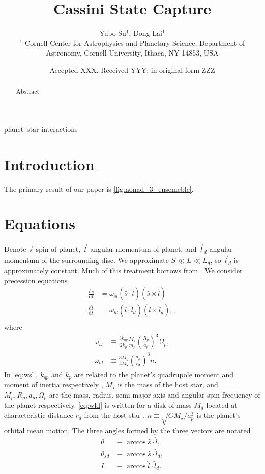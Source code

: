\documentclass[
        fleqn,
        usenatbib,
    ]{mnras}
\title[Cassini State Capture]{Cassini State Capture}
\author[Y. Su et\ al.]{
Yubo Su$^1$,
Dong Lai$^1$
\\
$^1$ Cornell Center for Astrophysics and Planetary Science, Department of
Astronomy, Cornell University, Ithaca, NY 14853, USA
}
\date{Accepted XXX\@. Received YYY\@; in original form ZZZ}
\newcommand*{\rd}[2]{\frac{\mathrm{d}#1}{\mathrm{d}#2}}
\newcommand*{\p}[1]{\left(#1\right)}
\begin{document}
\label{firstpage}
\pagerange{\pageref{firstpage}--\pageref{lastpage}}
\renewcommand*{\sectionautorefname}{Section}
\maketitle


\begin{abstract}
    Abstract
\end{abstract}

\begin{keywords}
planet--star interactions %
\end{keywords}

\section{Introduction}

The primary result of our paper is \autoref{fig:nonad_3_ensemeble}.

\section{Equations}\label{s:eq}

Denote $\vec{s}$ spin of planet, $\vec{l}$ angular momentum of planet, and
$\vec{l}_d$ angular momentum of the surrounding disc. We approximate $S \ll L
\ll L_d$, so $\vec{l}_d$ is approximately constant. Much of this treatment
borrows from \citep{anderson2018teeter}. We consider precession equations
\begin{align}
    \rd{\hat{s}}{t} &= \omega_{sl} \p{\hat{s} \cdot \hat{l}}
        \p{\hat{s} \times \hat{l}}\label{eq:dsdt}\\
    \rd{\hat{l}}{t} &= \omega_{ld}\p{\hat{l} \cdot \hat{l}_d}
        \p{\hat{l} \times \hat{l}_d},\label{eq:dldt},\\
\end{align}
where
\begin{align}
    \omega_{sl} &\equiv \frac{3k_{qp}}{2k_p} \frac{M_\star}{m_p}
        \p{\frac{R_p}{a_p}}^3 \Omega_p,\label{eq:wsl}\\
    \omega_{ld} &\equiv \frac{3M_d}{4M_\star}\p{\frac{a_p}{r_d}}^3 n
        .\label{eq:wld}
\end{align}
In \autoref{eq:wsl}, $k_{qp}$ and $k_p$ are related to the planet's quadrupole
moment and moment of inertia respectively \citep[see][]{lai2018}, $M_\star$ is
the mass of the host star, and $M_p, R_p, a_p, \Omega_p$ are the mass, radius,
semi-major axis and angular spin frequency of the planet respectively.
\autoref{eq:wld} is written for a disk of mass $M_d$ located at characteristic
distance $r_d$ from the host star \citep[see][for a power-law disk
profile]{millholland_disk}, $n \equiv \sqrt{GM_\star/a_p^3}$ is the planet's
orbital mean motion. The three angles formed by the three vectors are notated
\begin{align}
    \theta &\equiv \arccos \hat{s} \cdot \hat{l},\\
    \theta_{sd} &\equiv \arccos \hat{s} \cdot \hat{l}_d,\\
    I &\equiv \arccos \hat{l} \cdot \hat{l}_d.
\end{align}
\end{document}
